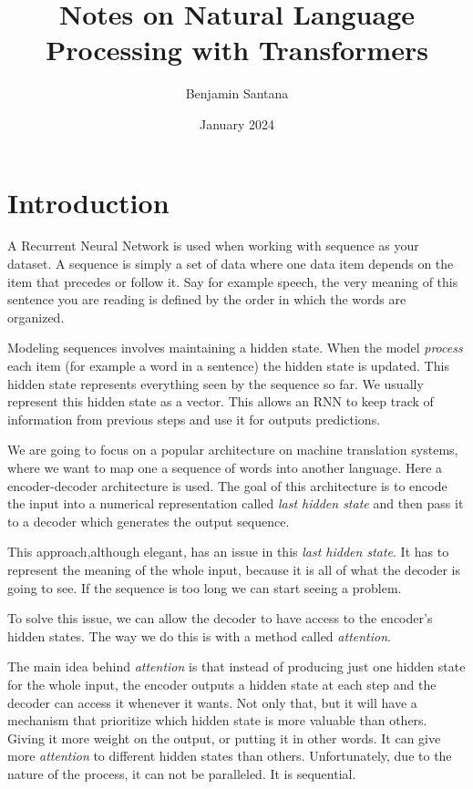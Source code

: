 \documentclass[twocolumn]{article}
\title{Notes on Natural Language Processing with Transformers}
\author{Benjamin Santana} \date{January 2024}
\begin{document}
 \maketitle

\section{Introduction}

A Recurrent Neural Network is used when working with sequence as your dataset.
A sequence is simply a set of data where one data item depends on the item that
precedes or follow it. Say for example speech, the very meaning of this sentence
you are reading is defined by the order in which the words are organized.

Modeling sequences involves maintaining a hidden state. When the model
\emph{process} each item (for example a word in a sentence) the hidden state
is updated. This hidden state represents everything seen by the sequence so
far.  We usually represent this hidden state as a vector. This allows an RNN
to keep track of information from previous steps and use it for outputs
predictions.

We are going to focus on a popular architecture on machine translation
systems, where we want to map one a sequence of words into another language.
Here a encoder-decoder architecture is used.  The goal of this architecture
is to encode the input into a numerical representation called \emph{last
hidden state} and then pass it to a decoder which generates the output
sequence.

This approach,although elegant, has an issue in this \emph{last hidden
state}. It has to represent the meaning of the whole input, because it is
all of what the decoder is going to see. If the sequence is too long we can
start seeing a problem.

To solve this issue, we can allow the decoder to have access to the encoder's
hidden states. The way we do this is with a method called \emph{attention}.

The main idea behind \emph{attention} is that instead of producing just one
hidden state for the whole input,  the encoder outputs a hidden state at each
step and the decoder can access it whenever it wants. Not only that, but
it will have a mechanism that prioritize which hidden state is more valuable
than others. Giving it more weight on the output, or putting it in other
words. It can give more \emph{attention} to different hidden states than
others. Unfortunately, due to the nature of the process, it can not be
paralleled. It is sequential.
\end{document}
